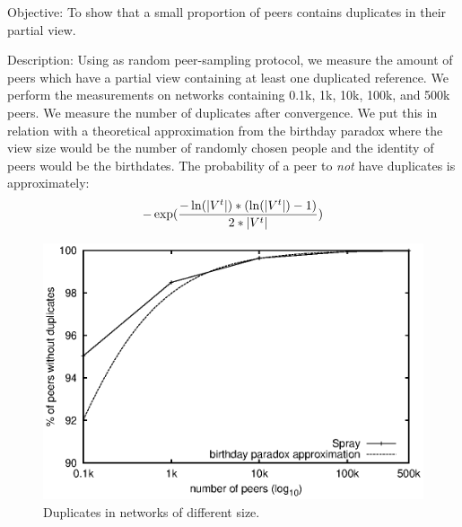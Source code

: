 \begin{asparadesc} 
\item[Objective:] To show that a small proportion of peers contains duplicates
  in their partial view.
\item[Description:] Using \SPRAY as random peer-sampling protocol, we measure
  the amount of peers which have a partial view containing at least one
  duplicated reference. We perform the measurements on networks containing 0.1k,
  1k, 10k, 100k, and 500k peers. We measure the number of duplicates after
  convergence. We put this in relation with a theoretical approximation from the
  birthday paradox where the view size would be the number of randomly chosen
  people and the identity of peers would be the birthdates. The probability of a
  peer to \emph{not} have duplicates is approximately:
  \begin{equation*} 
    -\exp({-\ln(|V^t|)*(\ln(|V^t|)-1)\over{2*|V^t|}})
  \end{equation*}

\begin{figure}
  \centering
  \includegraphics[width=\SCALE\textwidth]{img/duplicates.eps}
  \caption{\label{fig:duplicates}Duplicates in networks of different size.}
\end{figure}



\end{asparadesc}
